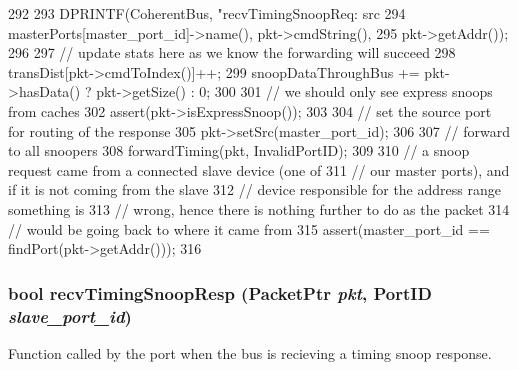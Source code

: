 \begin{DoxyCode}
292 {
293     DPRINTF(CoherentBus, "recvTimingSnoopReq: src %
294             masterPorts[master_port_id]->name(), pkt->cmdString(),
295             pkt->getAddr());
296 
297     // update stats here as we know the forwarding will succeed
298     transDist[pkt->cmdToIndex()]++;
299     snoopDataThroughBus += pkt->hasData() ? pkt->getSize() : 0;
300 
301     // we should only see express snoops from caches
302     assert(pkt->isExpressSnoop());
303 
304     // set the source port for routing of the response
305     pkt->setSrc(master_port_id);
306 
307     // forward to all snoopers
308     forwardTiming(pkt, InvalidPortID);
309 
310     // a snoop request came from a connected slave device (one of
311     // our master ports), and if it is not coming from the slave
312     // device responsible for the address range something is
313     // wrong, hence there is nothing further to do as the packet
314     // would be going back to where it came from
315     assert(master_port_id == findPort(pkt->getAddr()));
316 }
\end{DoxyCode}
\hypertarget{classCoherentBus_a29d5427944c6a4e363cf42eb70f480b1}{
\subsubsection[{recvTimingSnoopResp}]{\setlength{\rightskip}{0pt plus 5cm}bool recvTimingSnoopResp ({\bf PacketPtr} {\em pkt}, \/  {\bf PortID} {\em slave\_\-port\_\-id})}}
\label{classCoherentBus_a29d5427944c6a4e363cf42eb70f480b1}
Function called by the port when the bus is recieving a timing snoop response. 


